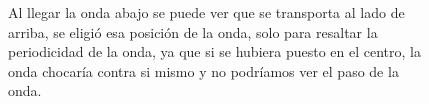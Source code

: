 \documentclass[12pt,a4paper]{book}
\begin{document}
\begin{figure}[H]
\centering
{}
\caption{Al llegar la onda abajo se puede ver que se transporta al lado de arriba, se eligió esa posición de la onda, solo para resaltar la periodicidad de la onda, ya que si se hubiera puesto en el centro, la onda chocaría contra si mismo y no podríamos ver el paso de la onda.} \label{fig:periodicas}
\end{figure}
\end{document}
